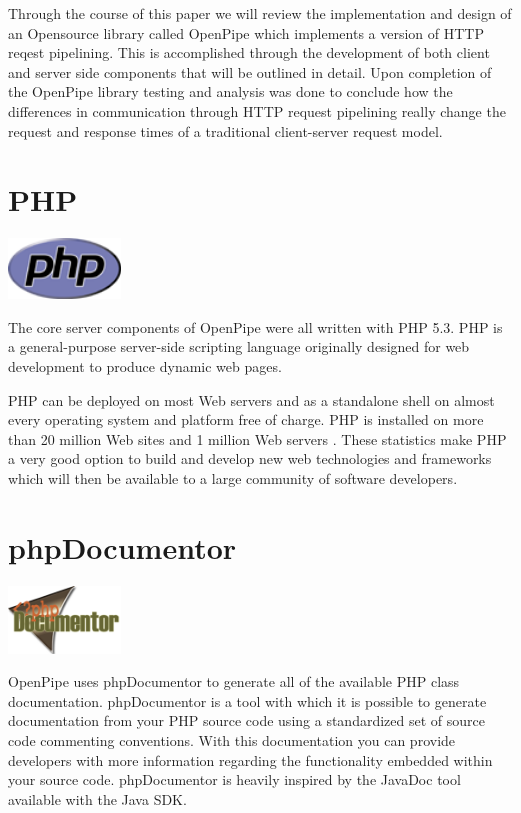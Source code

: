 \documentclass[12pt]{report}
\begin{document}
Through the course of this paper we will review the implementation and design of an Opensource library called OpenPipe which implements a version of HTTP reqest pipelining. This is accomplished through the development of both client and server side components that will be outlined in detail. Upon completion of the OpenPipe library testing and analysis was done to conclude how the differences in communication through HTTP request pipelining really change the request and response times of a traditional client-server request model.


\section{PHP}
\begin{center} 
\includegraphics[width=30mm]{figures/images/php_logo.png}
\end{center}

The core server components of OpenPipe were all written with PHP 5.3. PHP is a general-purpose server-side scripting language originally designed for web development to produce dynamic web pages.

PHP can be deployed on most Web servers and as a standalone shell on almost every operating system and platform free of charge.  PHP is installed on more than 20 million Web sites and 1 million Web servers \cite{phpWiki}. These statistics make PHP a very good option to build and develop new web technologies and frameworks which will then be available to a large community of software developers.


\section{phpDocumentor}
\begin{center} 
\includegraphics[width=30mm]{figures/images/php_documentor_logo.png}
\end{center}

OpenPipe uses phpDocumentor to generate all of the available PHP class documentation. phpDocumentor is a tool with which it is possible to generate documentation from your PHP source code using a standardized set of source code commenting conventions. With this documentation you can provide developers with more information regarding the functionality embedded within your source code. phpDocumentor is heavily inspired by the JavaDoc tool available with the Java SDK. 
\end{document}
